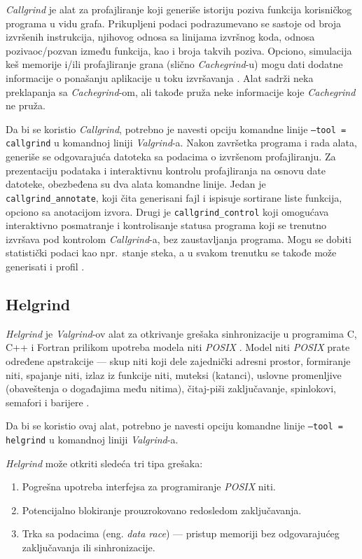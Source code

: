 \documentclass[12pt,oneside]{memoir}
\theoremstyle{plain}
\theoremstyle{definition}
\begin{document}
\textit{Callgrind} je alat za profajliranje koji generiše istoriju poziva funkcija korisničkog programa u vidu grafa. Prikupljeni podaci podrazumevano se sastoje od broja izvršenih instrukcija, njihovog odnosa sa linijama izvršnog koda, odnosa pozivaoc/pozvan između funkcija, kao i broja takvih poziva. Opciono, simulacija keš memorije i/ili profajliranje grana (slično \textit{Cachegrind}-u) mogu dati dodatne informacije o ponašanju aplikacije u toku izvršavanja \cite{Callgrind}. Alat sadrži neka preklapanja sa \textit{Cachegrind}-om, ali takođe pruža neke informacije koje \textit{Cachegrind} ne pruža.

Da bi se koristio \textit{Callgrind}, potrebno je navesti opciju komandne linije \texttt{--tool = callgrind} u komandnoj liniji \textit{Valgrind}-a. Nakon završetka programa i rada alata, generiše se odgovarajuća datoteka sa podacima o izvršenom profajliranju. Za prezentaciju podataka i interaktivnu kontrolu profajliranja na osnovu date datoteke, obezbeđena su dva alata komandne linije. Jedan je \texttt{callgrind\_annotate}, koji čita generisani fajl i ispisuje sortirane liste funkcija, opciono sa anotacijom izvora. Drugi je \texttt{callgrind\_control} koji omogućava interaktivno posmatranje i kontrolisanje statusa programa koji se trenutno izvršava pod kontrolom \textit{Callgrind}-a, bez zaustavljanja programa. Mogu se dobiti statistički podaci kao npr.~stanje steka, a u svakom trenutku se takođe može generisati i profil \cite{Callgrind}. 

\subsection{Helgrind}

\textit{Helgrind} je \textit{Valgrind}-ov alat za otkrivanje grešaka sinhronizacije u programima C, C++ i Fortran prilikom upotreba modela niti \textit{POSIX} \cite{Helgrind}. Model niti \textit{POSIX} prate određene apstrakcije --- skup niti koji dele zajednički adresni prostor, formiranje niti, spajanje niti, izlaz iz funkcije niti, muteksi (katanci), uslovne promenljive (obaveštenja o događajima među nitima), čitaj-piši zaključavanje, spinlokovi, semafori i barijere \cite{Helgrind}. 

Da bi se koristio ovaj alat, potrebno je navesti opciju komandne linije \texttt{--tool = helgrind} u komandnoj liniji \textit{Valgrind}-a.

\textit{Helgrind} može otkriti sledeća tri tipa grešaka:
\begin{enumerate}
\item Pogrešna upotreba interfejsa za programiranje \textit{POSIX} niti.
\item Potencijalno blokiranje prouzrokovano redosledom zaključavanja.
\item Trka sa podacima (eng. \textit{data race}) --- pristup memoriji bez odgovarajućeg zaključavanja ili sinhronizacije.
\end{enumerate}
\end{document}
